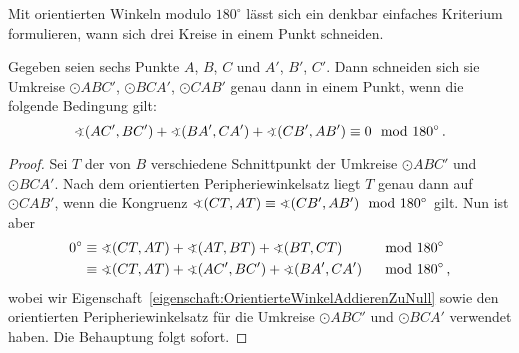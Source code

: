 Mit orientierten Winkeln modulo $180^\circ$ lässt sich ein denkbar einfaches Kriterium formulieren, wann sich drei Kreise in einem Punkt schneiden. %
\begin{satzmitnamen}[Lemma]
	Gegeben seien sechs Punkte $A$, $B$, $C$ und $A'$, $B'$, $C'$. Dann schneiden sich sie Umkreise $\odot ABC'$, $\odot BCA'$, $\odot CAB'$ genau dann in einem Punkt, wenn die folgende Bedingung gilt:
	\begin{equation*}
		\winkel(AC',BC') + \winkel (BA',CA') + \winkel(CB', AB')\equiv 0 \mod 180^\circ\,.
	\end{equation*}
\end{satzmitnamen}

\begin{proof}
	Sei $T$ der von $B$ verschiedene Schnittpunkt der Umkreise $\odot ABC'$ und $\odot BCA'$. Nach dem orientierten Peripheriewinkelsatz liegt $T$ genau dann auf $\odot CAB'$, wenn die Kongruenz $\winkel(CT,AT)\equiv\winkel (CB',AB') \mod 180^\circ$ gilt. Nun ist aber
	\begin{alignat*}{2}
		0^\circ&\equiv \winkel(CT,AT) +\winkel(AT,BT) + \winkel(BT,CT) &&\mod 180^\circ\\
		&\equiv \winkel(CT,AT) + \winkel(AC',BC') + \winkel(BA',CA') &&\mod 180^\circ\,,
	\end{alignat*}
	wobei wir Eigenschaft~\ref{eigenschaft:OrientierteWinkelAddierenZuNull} sowie den orientierten Peripheriewinkelsatz für die Umkreise $\odot ABC'$ und $\odot BCA'$ verwendet haben. Die Behauptung folgt sofort.
\end{proof}

